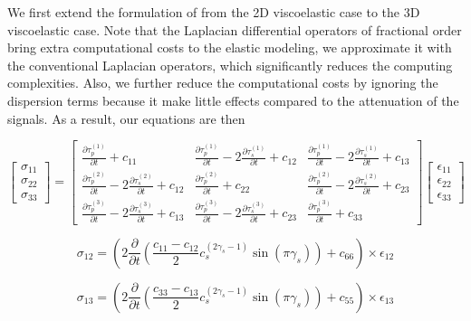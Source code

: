 \documentclass{paris17}
\begin{document}
We first extend the formulation of \cite[]{zhu2014theory} from the 2D viscoelastic case to the 3D viscoelastic case. Note that the Laplacian differential operators of fractional order bring extra computational costs to the elastic modeling, we approximate it with the conventional Laplacian operators, which significantly reduces the computing complexities. Also, we further reduce the computational costs by ignoring the dispersion terms because it make little effects compared to the attenuation of the signals. As a result, our equations are then

\begin{equation}
\begin{bmatrix} \sigma_{11}\\ \sigma_{22}\\ \sigma_{33} \end{bmatrix} = \begin{bmatrix} \frac{\partial \tau_p^{(1)}}{\partial t} + c_{11} & \frac{\partial \tau_p^{(1)}}{\partial t} - 2\frac{\partial \tau_s^{(1)}}{\partial t} +c_{12}& \frac{\partial \tau_p^{(1)}}{\partial t} - 2\frac{\partial \tau_s^{(1)}}{\partial t} +c_{13} \\ \frac{\partial \tau_p^{(2)}}{\partial t} - 2\frac{\partial \tau_s^{(2)}}{\partial t} +c_{12}& \frac{\partial \tau_p^{(2)}}{\partial t} + c_{22} & \frac{\partial \tau_p^{(2)}}{\partial t} - 2\frac{\partial \tau_s^{(2)}}{\partial t} +c_{23}\\ \frac{\partial \tau_p^{(3)}}{\partial t} - 2\frac{\partial \tau_s^{(3)}}{\partial t} +c_{13} & \frac{\partial \tau_p^{(3)}}{\partial t} - 2\frac{\partial \tau_s^{(3)}}{\partial t} +c_{23} & \frac{\partial \tau_p^{(3)}}{\partial t} + c_{33} \end{bmatrix} \begin{bmatrix} \epsilon_{11}\\ \epsilon_{22}\\ \epsilon_{33} \end{bmatrix}
\end{equation}

\begin{equation}
  \sigma_{12} = \left ( 2\frac{\partial}{\partial t} \left( \frac{c_{11}-c_{12}}{2}c_s^{(2\gamma_s-1)}\sin(\pi\gamma_s) \right) + c_{66} \right )\times \epsilon_{12}
\end{equation}

\begin{equation}
  \sigma_{13} = \left ( 2\frac{\partial}{\partial t} \left( \frac{c_{33}-c_{13}}{2}c_s^{(2\gamma_s-1)}\sin(\pi\gamma_s) \right) + c_{55} \right )\times \epsilon_{13}
\end{equation}
\end{document}
